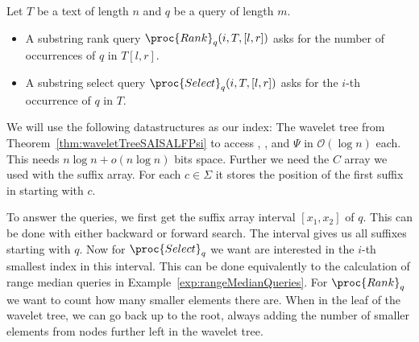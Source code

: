 \begin{Example}
  Let $T$ be a text of length $n$ and $q$ be a query of length $m$.
  \begin{itemize}
    \item A substring rank query $\proc{Rank}_q(i, T, [l, r])$ asks for the number of occurrences of $q$ in $T[l, r]$.
    \item A substring select query $\proc{Select}_q(i, T, [l, r])$ asks for the $i$-th occurrence of $q$ in $T$.
  \end{itemize}

  We will use the following datastructures as our index: The wavelet tree from Theorem~\ref{thm:waveletTreeSAISALFPsi} to access , ,  and $\Psi$ in $\mathcal{O}(\log n)$ each. This needs $n \log n + o(n \log n)$ bits space. Further we need the $C$ array we used with the suffix array. For each $c \in \Sigma$ it stores the position of the first suffix in  starting with $c$.

  To answer the queries, we first get the suffix array interval $[x_1, x_2]$ of $q$. This can be done with either backward or forward search. The interval gives us all suffixes starting with $q$. Now for $\proc{Select}_q$ we want are interested in the $i$-th smallest index in this interval. This can be done equivalently to the calculation of range median queries in Example~\ref{exp:rangeMedianQueries}. For $\proc{Rank}_q$ we want to count how many smaller elements there are. When in the leaf of the wavelet tree, we can go back up to the root, always adding the number of smaller elements from nodes further left in the wavelet tree.
\end{Example}
